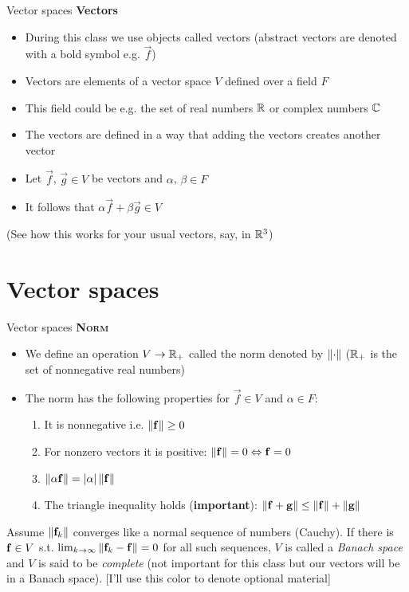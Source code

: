 
\begin{frame}{Vector spaces}
	\textbf{Vectors}
	\begin{itemize}
		\item During this class we use objects called \alert{vectors} (abstract vectors are denoted with a bold symbol e.g. $ \vec{f} $)
		\item Vectors are elements of a \alert{vector space} $ V $ defined over a \alert{field} $ F $
		\item This field could be e.g. the set of real numbers $ \mathbb{R} $ or complex numbers $ \mathbb{C} $
	\end{itemize}
	\vspace{1em}
	\begin{itemize}
		\item The vectors are defined in a way that adding the vectors creates another vector
		\item Let $ \vec{f} $, $ \vec{g} \in V$ be vectors and $ \alpha $, $ \beta \in F$
		\item It follows that $ \alpha \vec{f} + \beta \vec{g} \in V $
	\end{itemize}
(See how this works for your usual vectors, say, in $ \mathbb{R}^3 $)
\end{frame}

\section{Vector spaces}


\begin{frame}{Vector spaces}
	\textbf{\textsc{Norm}}
	\begin{itemize}
		\item We define an operation $ V \to \mathbb{R}_{+}$ called the \alert{norm} denoted by $ \left\lVert\cdot\right\rVert $ ($ \mathbb{R}_+ $ is the set of nonnegative real numbers)
		\item The norm has the following properties for $ \vec{f} \in V $ and $ \alpha \in F $:
		\begin{enumerate}
			\item It is nonnegative i.e. $ \left\lVert\mathbf{f}\right\rVert \geq 0 $
			\item For nonzero vectors it is positive: $ \left\lVert\mathbf{f}\right\rVert = 0 \Leftrightarrow \mathbf{f} = 0 $ 
			\item $ \left\lVert\alpha \mathbf{f}\right\rVert = |\alpha| \left\lVert\mathbf{f}\right\rVert$
			\item The triangle inequality holds (\textbf{important}): $ \left\lVert\mathbf{f} + \mathbf{g}\right\rVert \leq \left\lVert\mathbf{f}\right\rVert + \left\lVert\mathbf{g}\right\rVert $
		\end{enumerate}
	\end{itemize}
%
{\color{olive}
Assume $ \left\lVert\mathbf{f}_k\right\rVert $ converges like a normal sequence of numbers (Cauchy). If there is $ \mathbf{f} \in V $ s.t. $ \lim_{k \to \infty} \left\lVert\mathbf{f}_k - \mathbf{f}\right\rVert = 0 $ for all such sequences, 
$ V $ is called a \emph{Banach space} and $ V $ is said to be \emph{complete} (not important for this class but our vectors will be in a Banach space). [I'll use this color to denote optional material]
}
\end{frame}

